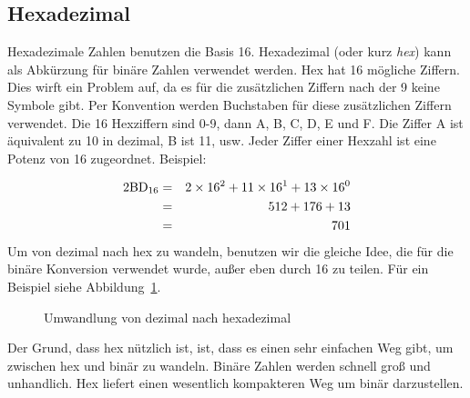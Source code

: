 \subsection{Hexadezimal}

Hexadezimale Zahlen benutzen die Basis 16. Hexadezimal (oder kurz
\emph{hex}) kann als Abk\"{u}rzung f\"{u}r bin\"{a}re Zahlen verwendet werden.
Hex hat 16 m\"{o}gliche Ziffern. Dies wirft ein Problem auf, da es f\"{u}r
die zus\"{a}tzlichen Ziffern nach der 9 keine Symbole gibt. Per
Konvention werden Buchstaben f\"{u}r diese zus\"{a}tzlichen Ziffern
verwendet. Die 16 Hexziffern sind 0-9, dann A, B, C, D, E und F\@.
Die Ziffer A ist \"{a}quivalent zu 10 in dezimal, B ist 11, usw. Jeder
Ziffer einer Hexzahl ist eine Potenz von 16 zugeordnet. Beispiel:

{\samepage
\begin{eqnarray*}
\rm
 2BD_{16} & = & 2 \times 16^2 + 11 \times 16^1 + 13 \times 16^0 \\
          & = & 512 + 176 + 13 \\
          & = & 701
\end{eqnarray*}
}Um von dezimal nach hex zu wandeln, benutzen wir die gleiche Idee,
die f\"{u}r die bin\"{a}re Konversion verwendet wurde, au{\ss}er eben durch 16
zu teilen. F\"{u}r ein Beispiel siehe Abbildung~\ref{fig:hex-conv}.

\begin{figure}[ht]
\centering
{}
\caption{Umwandlung von dezimal nach hexadezimal\label{fig:hex-conv}}
\end{figure}

Der Grund, dass hex n\"{u}tzlich ist, ist, dass es einen sehr einfachen
Weg gibt, um zwischen hex und bin\"{a}r zu wandeln. Bin\"{a}re Zahlen werden
schnell gro{\ss} und unhandlich. Hex liefert einen wesentlich
kompakteren Weg um bin\"{a}r darzustellen.

